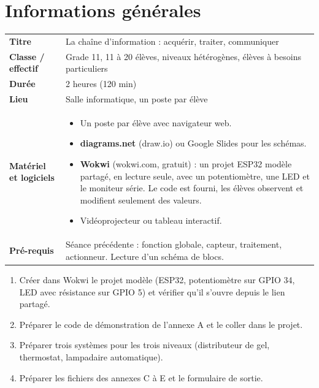 \documentclass[11pt,a4paper]{article}
\begin{document}

\section{Informations générales}
\begin{tabularx}{\linewidth}{>{\bfseries}p{3.6cm}Y}
\toprule
Titre & La chaîne d'information : acquérir, traiter, communiquer\\
Classe / effectif & Grade 11, 11 à 20 élèves, niveaux hétérogènes, élèves à besoins particuliers\\
Durée & 2 heures (120 min)\\
Lieu & Salle informatique, un poste par élève\\
Matériel et logiciels &
\begin{itemize}
 \item Un poste par élève avec navigateur web.
 \item \textbf{diagrams.net} (draw.io) ou Google Slides pour les schémas.
 \item \textbf{Wokwi} (wokwi.com, gratuit) : un projet ESP32 modèle partagé, en lecture seule, avec un potentiomètre, une LED et le moniteur série. Le code est fourni, les élèves observent et modifient seulement des valeurs.
 \item Vidéoprojecteur ou tableau interactif.
\end{itemize}\\
Pré-requis &
Séance précédente : fonction globale, capteur, traitement, actionneur. Lecture d'un schéma de blocs.\\
\bottomrule
\end{tabularx}

\begin{astuce}
\begin{enumerate}
 \item Créer dans Wokwi le projet modèle (ESP32, potentiomètre sur GPIO 34, LED avec résistance sur GPIO 5) et vérifier qu'il s'ouvre depuis le lien partagé.
 \item Préparer le code de démonstration de l'annexe A et le coller dans le projet.
 \item Préparer trois systèmes pour les trois niveaux (distributeur de gel, thermostat, lampadaire automatique).
 \item Préparer les fichiers des annexes C à E et le formulaire de sortie.
\end{enumerate}
\end{astuce}
\end{document}
